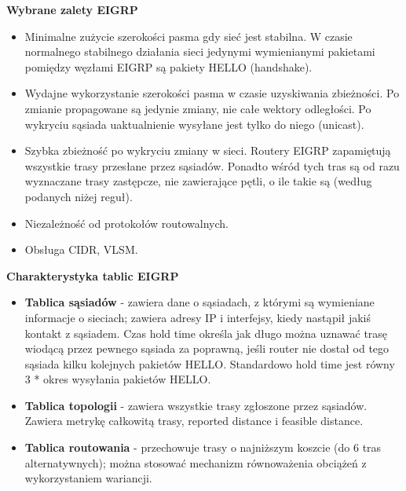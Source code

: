 \documentclass[../main.tex]{subfiles}
\begin{document}
    \textbf{Wybrane zalety EIGRP}
    \begin{itemize}
        \item Minimalne zużycie szerokości pasma gdy sieć jest stabilna. W czasie normalnego
        stabilnego działania sieci jedynymi wymienianymi pakietami pomiędzy węzłami EIGRP są
        pakiety HELLO (handshake).
        \item Wydajne wykorzystanie szerokości pasma w czasie uzyskiwania zbieżności. Po zmianie
        propagowane są jedynie zmiany, nie całe wektory odległości. Po wykryciu sąsiada
        uaktualnienie wysyłane jest tylko do niego (unicast).
        \item Szybka zbieżność po wykryciu zmiany w sieci. Routery EIGRP zapamiętują wszystkie trasy
        przesłane przez sąsiadów. Ponadto wśród tych tras są od razu wyznaczane trasy
        zastępcze, nie zawierające pętli, o ile takie są (według podanych niżej reguł).
        \item Niezależność od protokołów routowalnych.
        \item Obsługa CIDR, VLSM.

    \end{itemize}


    \textbf{Charakterystyka tablic EIGRP}
    \begin{itemize}
        \item \textbf{Tablica sąsiadów} - zawiera dane o sąsiadach, z którymi są wymieniane
        informacje o sieciach; zawiera adresy IP i interfejsy, kiedy nastąpił jakiś kontakt z
        sąsiadem. Czas hold time określa jak długo można uznawać trasę wiodącą przez pewnego
        sąsiada za poprawną, jeśli router nie dostał od tego sąsiada kilku kolejnych pakietów
        HELLO. Standardowo hold time jest równy 3 * okres wysyłania pakietów HELLO.
        \item \textbf{Tablica topologii} - zawiera wszystkie trasy zgłoszone przez
        sąsiadów. Zawiera metrykę całkowitą trasy, reported distance i feasible distance.
        \item \textbf{Tablica routowania} - przechowuje trasy o najniższym koszcie (do 6 tras
        alternatywnych); można stosować mechanizm równoważenia obciążeń z wykorzystaniem wariancji.
    \end{itemize}
\end{document}
